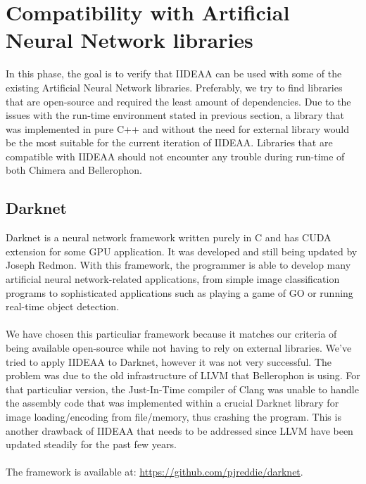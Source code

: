 \section{Compatibility with Artificial Neural Network libraries}

In this phase, the goal is to verify that IIDEAA can be used with some of the existing Artificial Neural Network libraries. Preferably, we try to find libraries that are open-source and required the least amount of dependencies. Due to the issues with the run-time environment stated in previous section, a library that was implemented in pure C++ and without the need for external library would be the most suitable for the current iteration of IIDEAA. Libraries that are compatible with IIDEAA should not encounter any trouble during run-time of both Chimera and Bellerophon.\\

\subsection{Darknet}

Darknet\cite{darknet13} is a neural network framework written purely in C and has CUDA extension for some GPU application. It was developed and still being updated by Joseph Redmon. With this framework, the programmer is able to develop many artificial neural network-related applications, from simple image classification programs to sophisticated applications such as playing a game of GO or running real-time object detection.\\
~\\
We have chosen this particuliar framework because it matches our criteria of being available open-source while not having to rely on external libraries. We've tried to apply IIDEAA to Darknet, however it was not very successful. The problem was due to the old infrastructure of LLVM that Bellerophon is using. For that particuliar version, the Just-In-Time compiler of Clang was unable to handle the assembly code that was implemented within a crucial Darknet library for image loading/encoding from file/memory, thus crashing the program. This is another drawback of IIDEAA that needs to be addressed since LLVM have been updated steadily for the past few years. \\
~\\
The framework is available at: \url{https://github.com/pjreddie/darknet}.\\
\vspace*{3cm}

